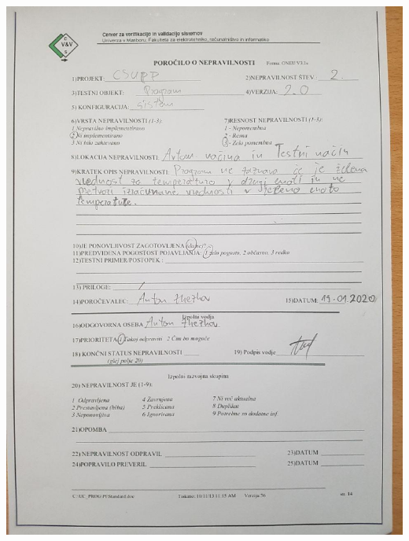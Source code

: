 \documentclass[a4paper,12pt]{article}
\begin{document}
{	\includegraphics[width=15cm]{porocila/09.jpg}
	
\newpage
	
	\hspace{2cm}

	\vspace{2cm}
	
}
\end{document}
